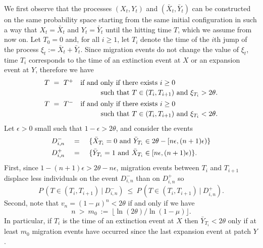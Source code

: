 \indent We first observe that the processes $(X_t, Y_t)$ and $(\bar X_t, \bar Y_t)$ can be constructed on the same probability space
 starting from the same initial configuration in such a way that $X_t = \bar X_t$ and $Y_t = \bar Y_t$ until the hitting time $T$,
 which we assume from now on.
 Let $T_0 = 0$ and, for all $i \geq 1$, let $T_i$ denote the time of the $i$th jump of the process $\xi_t := \bar X_t + \bar Y_t$.
 Since migration events do not change the value of $\xi_t$, time $T_i$ corresponds to the time of an extinction event at
 $X$ or an expansion event at $Y$, therefore we have
 $$ \begin{array}{l}
     T \ = \ T^+ \quad \hbox{if and only if} \ \hbox{there exists $i \geq 0$} \vspace{2pt} \\
               \hspace{80pt} \hbox{such that $T \in (T_i, T_{i + 1})$ and $\xi_{T_i} > 2 \theta$}. \vspace{4pt} \\
     T \ = \ T^- \quad \hbox{if and only if} \ \hbox{there exists $i \geq 0$} \vspace{2pt} \\
               \hspace{80pt} \hbox{such that $T \in (T_i, T_{i + 1})$ and $\xi_{T_i} < 2 \theta$}. \end{array} $$
 Let $\epsilon > 0$ small such that $1 - \epsilon > 2 \theta$, and consider the events
 $$ \begin{array}{rcl}
  D_{i, n}^- \ & = & \ \{\bar X_{T_i} = 0 \ \hbox{and} \ \bar Y_{T_i} \in 2 \theta - [n \epsilon, (n + 1) \epsilon) \} \vspace{4pt} \\
  D_{i, n}^+ \ & = & \ \{\bar Y_{T_i} = 1 \ \hbox{and} \ \bar X_{T_i} \in [n \epsilon, (n + 1) \epsilon) \}. \end{array} $$
 First, since $1 - (n + 1) \epsilon > 2 \theta - n \epsilon$, migration events between $T_i$ and $T_{i + 1}$ displace
 less individuals on the event $D_{i, n}^-$ than on $D_{i, n}^+$ so
 $$ P \,(T \in (T_i, T_{i + 1}) \ | \ D_{i, n}^-) \ \leq \ P \,(T \in (T_i, T_{i + 1}) \ | \ D_{i, n}^+). $$
 Second, note that $v_n = (1 - \mu)^n < 2 \theta$ if and only if we have
 $$ n \ > \ m_0 \ := \ \lfloor \ln (2 \theta) / \ln (1 - \mu) \rfloor. $$
 In particular, if $T_i$ is the time of an extinction event at $X$ then $\bar Y_{T_i} < 2 \theta$ only if at least $m_0$ migration
 events have occurred since the last expansion event at patch $Y$.
